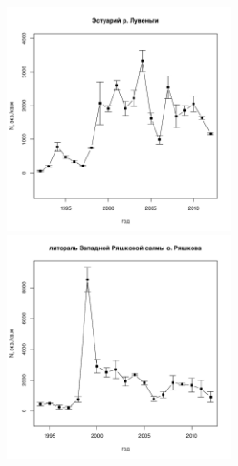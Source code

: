 \documentclass[12pt, a4paper]{article}
\begin{document}
\begin{figure}[h]
\begin{minipage}[b]{.46\linewidth}
\begin{center}
\includegraphics[width=65mm]{../White_Sea/Estuatiy_Luvenga/N2_dynamic.pdf}
\end{center}
\end{minipage}
%
\hfil %
%
\begin{minipage}[b]{.46\linewidth}
\begin{center}
\includegraphics[width=65mm]{../White_Sea/Ryashkov_ZRS/N2_dynamic.pdf}
\end{center}
\end{minipage}



\end{figure}
\end{document}
